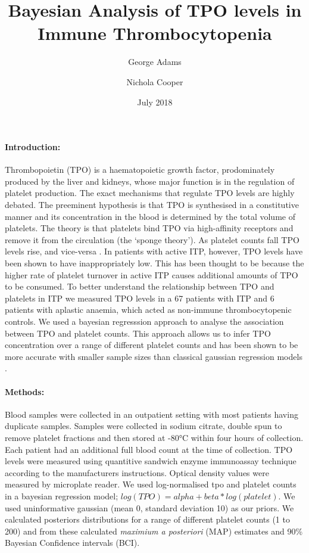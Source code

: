 \documentclass[11pt]{article}
\title{Bayesian Analysis of TPO levels in Immune Thrombocytopenia}
\author[1,2]{\small George Adams}
\author[1,2]{\small Nichola Cooper}
\affil[1]{\footnotesize Imperial College London, Kensington, London SW7 2AZ}
\affil[2]{\footnotesize Hammersmith Hospital, Imperial College NHS Trust, London W12 0HS}
\date{July 2018}
\begin{document}
\maketitle

\paragraph{Introduction:} Thrombopoietin (TPO) is a haematopoietic growth factor, prodominately produced by the liver and kidneys, whose major function is in the regulation of platelet production. The exact mechanisms that regulate TPO levels are highly debated. The preeminent hypothesis is that TPO is synthesised in a constitutive manner and its concentration in the blood is determined by the total volume of platelets. The theory is that platelets bind TPO via high-affinity receptors and remove it from the circulation (the `sponge theory'). As platelet counts fall TPO levels rise, and vice-versa \cite{EtoLinkagemechanismsthrombocytopenia2016}. In patients with active ITP, however, TPO levels have been shown to have inappropriately low. This has been thought to be because the higher rate of platelet turnover in active ITP causes additional amounts of TPO to be consumed. To better understand the relationship between TPO and platelets in ITP we measured TPO levels in a 67 patients with ITP and 6 patients with aplastic anaemia, which acted as non-immune thrombocytopenic controls. We used a bayesian regresssion approach to analyse the association between TPO and platelet counts. This approach allows us to infer TPO concentration over a range of different platelet counts and has been shown to be more accurate with smaller sample sizes than classical gaussian regression models \cite{GoldsteinBayesiananalysisregression1976}.


\paragraph{Methods:} Blood samples were collected in an outpatient setting with most patients having duplicate samples. Samples were collected in sodium citrate, double spun to remove platelet fractions and then stored at -80°C within four hours of collection. Each patient had an additional full blood count at the time of collection. TPO levels were measured using quantitive sandwich enzyme immunoassay technique according to the manufacturers instructions. Optical density values were measured by microplate reader. We used log-normalised tpo and platelet counts in a bayesian regression model; $log(TPO) = alpha + beta*log(platelet)$. We used uninformative gaussian (mean 0, standard deviation 10) as our priors. We calculated posteriors distributions for a range of different platelet counts (1 to 200) and from these calculated \textit{maximium a posteriori} (MAP) estimates and 90\% Bayesian Confidence intervals (BCI).
\end{document}

